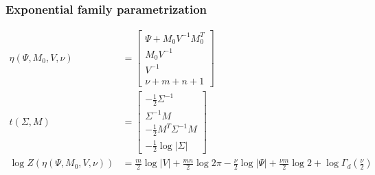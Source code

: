 \subsubsection*{Exponential family parametrization}
\begin{align*}
    \eta(\Psi, M_0, V, \nu) &= \begin{bmatrix}\Psi + M_0V^{-1}M_0^T\\M_0V^{-1}\\V^{-1}\\\nu + m + n + 1\end{bmatrix} \\
    t(\Sigma, M) &= \begin{bmatrix}-\frac{1}{2}\Sigma^{-1}\\\Sigma^{-1}M\\-\frac{1}{2}M^T\Sigma^{-1}M\\-\frac{1}{2}\log|\Sigma|\end{bmatrix} \\
    \log Z(\eta(\Psi, M_0, V, \nu)) &= \frac{m}{2}\log|V| + \frac{mn}{2}\log 2\pi - \frac{\nu}{2}\log |\Psi| + \frac{\nu m}{2}\log 2 + \log \Gamma_d\left(\frac{\nu}{2}\right)
\end{align*}
